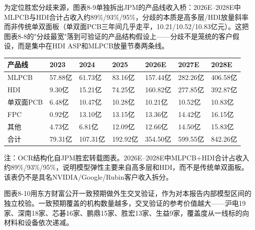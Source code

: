 为定位胜宏分歧来源，图表8-9单独拆出JPM的产品线收入桥：2026E--2028E中MLPCB与HDI合计占收入约89\%/93\%/95\%，分歧的本质是高多层/HDI放量斜率而非传统单双面板（单双面PCB三年间几乎走平，10.21/10.52/10.83亿元）。这把图表8-8的"分歧最宽"落到可验证的产品结构假设上——分歧不是笼统的客户假设，而是集中在HDI ASP和MLPCB放量节奏两条线。

\begin{exhibitbox}
\footnotesize
\begin{tabularx}{\textwidth}{L{2.2cm}R{1.5cm}R{1.5cm}R{1.5cm}R{1.5cm}R{1.5cm}R{1.5cm}}
\toprule
\textbf{产品线} & \textbf{2023} & \textbf{2024} & \textbf{2025} & \textbf{2026E} & \textbf{2027E} & \textbf{2028E} \\
\midrule
MLPCB & 57.88亿 & 61.73亿 & 83.16亿 & 157.44亿 & 282.26亿 & 406.58亿 \\
HDI & 9.30亿 & 15.21亿 & 74.25亿 & 160.82亿 & 277.85亿 & 392.87亿 \\
单双面PCB & 6.48亿 & 10.47亿 & 10.28亿 & 10.21亿 & 10.52亿 & 10.83亿 \\
FPC & 0.92亿 & 13.10亿 & 13.15亿 & 13.36亿 & 14.42亿 & 16.15亿 \\
其他 & 4.73亿 & 6.81亿 & 12.09亿 & 12.66亿 & 14.50亿 & 15.83亿 \\
合计 & 79.31亿 & 107.31亿 & 192.92亿 & 354.50亿 & 599.55亿 & 842.26亿 \\
\bottomrule
\end{tabularx}
\vspace{0.3em}
\scriptsize 注：OCR结构化自JPM胜宏转载图表。2026E--2028E中MLPCB+HDI合计占收入约89\%/93\%/95\%，说明模型弹性主要来自高多层和HDI，而不是传统单双面板。该表仍不是具名NVIDIA/Google/Rubin客户收入拆分。
\end{exhibitbox}

图表8-10用东方财富公开一致预期做外生交叉验证，作为对本报告内部模型区间的独立校验。一致预期覆盖的机构数量越多，交叉验证的参考价值越大——沪电19家、深南18家、芯碁16家、鹏鼎15家、胜宏13家、生益9家，覆盖度从一线标的向材料和设备依次递减。

